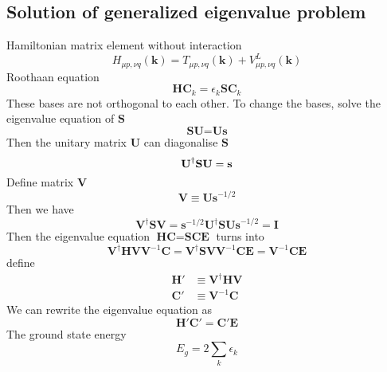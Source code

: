 \documentclass{article}
\begin{document}
    \subsection{Solution of generalized eigenvalue problem}
        Hamiltonian matrix element without interaction
        \begin{equation}
            H_{\mu p,\nu q}(\textbf{k}) = T_{\mu p,\nu q}(\textbf{k}) + V_{\mu p,\nu q}^L(\textbf{k})
        \end{equation}
        Roothaan equation
        \begin{equation}
            \textbf{HC}_k = \epsilon_k\textbf{SC}_k
        \end{equation}
        These bases are not orthogonal to each other. 
        To change the bases, solve the eigenvalue equation of $\textbf{S}$
        $$ \textbf{SU} = \textbf{Us} $$
        Then the unitary matrix $\textbf{U}$ can diagonalise $\textbf{S}$
        $$ \textbf{U}^\dagger\textbf{SU} = \textbf{\textbf{s}} $$
        Define matrix $\textbf{V}$
        \begin{equation}
            \textbf{V} \equiv \textbf{Us}^{-1/2}
        \end{equation}
        Then we have
        $$ \textbf{V}^\dagger\textbf{SV} = \textbf{s}^{-1/2}\textbf{U}^\dagger\textbf{SUs}^{-1/2} = \textbf{I} $$
        Then the eigenvalue equation $\textbf{HC} = \textbf{SCE}$ turns into
        $$ \textbf{V}^\dagger\textbf{HVV}^{-1}\textbf{C} =  \textbf{V}^\dagger\textbf{SVV}^{-1}\textbf{C}\textbf{E} = \textbf{V}^{-1}\textbf{C}\textbf{E} $$
        define
        \begin{align}
            \textbf{H}' &\equiv \textbf{V}^\dagger\textbf{HV}\\
            \textbf{C}' &\equiv \textbf{V}^{-1}\textbf{C}
        \end{align}
        We can rewrite the eigenvalue equation as
        \begin{equation}
            \textbf{H}'\textbf{C}' = \textbf{C}'\textbf{E}
        \end{equation}
        The ground state energy
        \begin{equation}
            E_g = 2\sum_k\epsilon_k
        \end{equation}
        
\end{document}
